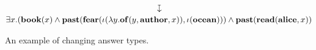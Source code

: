 \begin{landscape}
\begin{figure}
\begin{mdframed}
      \vspace*{-1\baselineskip}
      \begin{gather*}
        \downmapsto
        \\
        \exists{x}.
        (\BOOK(x)\wedge\PAST(\FEAR(\iota(\lambda{y}.\OF(y,\AUTHOR,x)),\iota(\OCEAN)))
        \wedge\PAST(\READ(\ALICE,x))
      \end{gather*}
    \end{mdframed}
    \caption{An example of changing answer types.}
    \label{fig:example-changing-answer-type}
  \end{figure}
\end{landscape}
%
